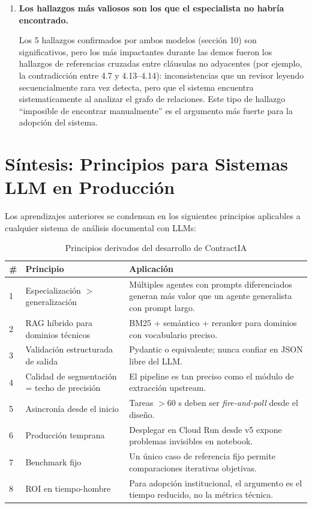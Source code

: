 \begin{enumerate}
    \item \textbf{Los hallazgos más valiosos son los que el especialista no habría encontrado.}

    Los 5 hallazgos confirmados por ambos modelos (sección 10) son
    significativos, pero los más impactantes durante las demos fueron
    los hallazgos de referencias cruzadas entre cláusulas no adyacentes
    (por ejemplo, la contradicción entre 4.7 y 4.13--4.14): inconsistencias
    que un revisor leyendo secuencialmente rara vez detecta, pero que el
    sistema encuentra sistematicamente al analizar el grafo de relaciones.
    Este tipo de hallazgo ``imposible de encontrar manualmente'' es el
    argumento más fuerte para la adopción del sistema.

\end{enumerate}

\section*{Síntesis: Principios para Sistemas LLM en Producción}

Los aprendizajes anteriores se condensan en los siguientes principios
aplicables a cualquier sistema de análisis documental con LLMs:

\begin{table}[H]
\centering
\caption{Principios derivados del desarrollo de ContractIA}
\label{tab:principios}
\begin{tabular}{p{1cm} p{4.5cm} p{8cm}}
\toprule
\textbf{\#} & \textbf{Principio} & \textbf{Aplicación} \\
\midrule
1 & Especialización $>$ generalización &
    Múltiples agentes con prompts diferenciados generan más valor que un
    agente generalista con prompt largo. \\
2 & RAG híbrido para dominios técnicos &
    BM25 + semántico + reranker para dominios con vocabulario preciso. \\
3 & Validación estructurada de salida &
    Pydantic o equivalente; nunca confiar en JSON libre del LLM. \\
4 & Calidad de segmentación = techo de precisión &
    El pipeline es tan preciso como el módulo de extracción upstream. \\
5 & Asincronía desde el inicio &
    Tareas $> 60$ s deben ser \textit{fire-and-poll} desde el diseño. \\
6 & Producción temprana &
    Desplegar en Cloud Run desde v5 expone problemas invisibles en notebook. \\
7 & Benchmark fijo &
    Un único caso de referencia fijo permite comparaciones iterativas objetivas. \\
8 & ROI en tiempo-hombre &
    Para adopción institucional, el argumento es el tiempo reducido, no la
    métrica técnica. \\
\bottomrule
\end{tabular}
\end{table}